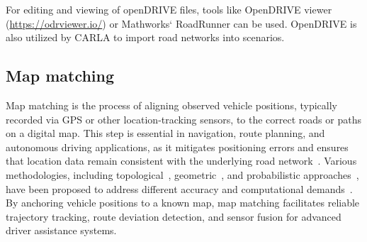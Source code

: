             For editing and viewing of openDRIVE files, tools like OpenDRIVE viewer (\url{https://odrviewer.io/}) or Mathworks` RoadRunner can be used.
            OpenDRIVE is also utilized by CARLA to import road networks into scenarios.

        \subsection{Map matching}\label{subsec:basics-map-matching}
            Map matching is the process of aligning observed vehicle positions, typically recorded via GPS or other location-tracking sensors, to the correct roads or paths on a digital map.
            This step is essential in navigation, route planning, and autonomous driving applications, as it mitigates positioning errors and ensures that location data remain consistent with the underlying road network~\cite{huang2021survey}.
            Various methodologies, including topological~\cite{white2000some, joshi2001new, greenfeld2002matching}, geometric~\cite{bernstein1996introduction}, and probabilistic approaches~\cite{Quddus2006}, have been proposed to address different accuracy and computational demands~\cite{quddus2007current}.
            By anchoring vehicle positions to a known map, map matching facilitates reliable trajectory tracking, route deviation detection, and sensor fusion for advanced driver assistance systems.


